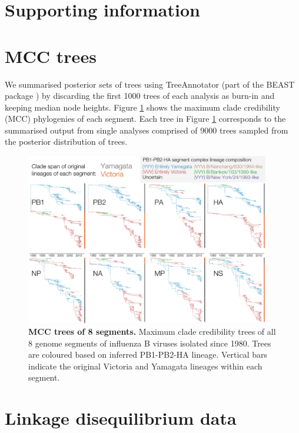 \documentclass[11pt,oneside,letterpaper]{article}
\begin{document}
\newpage

\section*{Supporting information}
\setcounter{figure}{0}
\setcounter{table}{0}
\renewcommand{\thefigure}{S\arabic{figure}}
\renewcommand{\thetable}{S\arabic{table}}


\section*{MCC trees}

We summarised posterior sets of trees using TreeAnnotator (part of the BEAST package \cite{drummond2012}) by discarding the first 1000 trees of each analysis as burn-in and keeping median node heights.
Figure \ref{genomeGrid} shows the maximum clade credibility (MCC) phylogenies of each segment.
Each tree in Figure \ref{genomeGrid} corresponds to the summarised output from single analyses comprised of 9000 trees sampled from the posterior distribution of trees.

\begin{figure}
\centering  
\includegraphics[width=0.95\textwidth]  {supp_figures/InfB_genomeGrid.pdf}
\caption{\textbf{MCC trees of 8 segments.}
Maximum clade credibility trees of all 8 genome segments of influenza B viruses isolated since 1980.
Trees are coloured based on inferred PB1-PB2-HA lineage.
Vertical bars indicate the original Victoria and Yamagata lineages within each segment.}
\label{genomeGrid}
\end{figure}

\section*{Linkage disequilibrium data}
\end{document}
